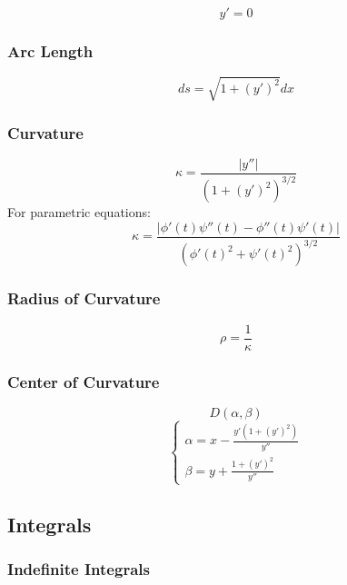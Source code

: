 \documentclass{article}
\begin{document}
\[
    y' = 0
\]

\subsubsection{Arc Length}

\[
    ds = \sqrt{1 + (y')^2} dx
\]

\subsubsection{Curvature}

\[
    \kappa = \frac{|y''|}{(1 + (y')^2)^{3/2}}
\]
For parametric equations:
\[
    \kappa = \frac{|\phi'(t)\psi''(t) - \phi''(t)\psi'(t)|}{(\phi'(t)^2 + \psi'(t)^2)^{3/2}}
\]

\subsubsection{Radius of Curvature}

\[
    \rho = \frac{1}{\kappa}
\]

\subsubsection{Center of Curvature}

\[
    D(\alpha, \beta)
\]
\[
    \begin{cases}
        \alpha = x - \frac{y'(1 + (y')^2)}{y''} \\
        \beta = y + \frac{1 + (y')^2}{y''}
    \end{cases}
\]

\subsection{Integrals}

\subsubsection{Indefinite Integrals}
\end{document}

